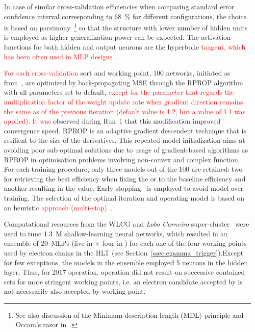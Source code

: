 In case of similar cross-validation efficiencies when comparing standard
error confidence interval corresponding to \SI{68}{\%} for different
configurations, the choice is based on
parsimony~\cite{medeiros2001statistical}\footnote{See also discussion of the
  Minimum-description-length (MDL) principle and Occam's razor
in~\cite{haykin_2008}.} so that the structure with lower number of hidden units
is employed as higher generalization power can be expected. The activation
functions for both hidden and output neurons are the hyperbolic \textcolor{red}{tangent, which has been often used in MLP designs~\cite{haykin_2008}}.






\textcolor{red}{For each cross-validation} sort and working point, 100 networks, initiated
as from~\cite{initnw}, are optimized by back-propagating MSE through the RPROP
algorithm~\cite{rprop} with all parameters set to default,
\textcolor{red}{except for the parameter that regards the multiplication factor of the weight update rate when gradient direction remains the same as of the previous iteration (default value is 1.2, but a value of 1.1 was applied). It was }
observed during Run~1 that this modification improved convergence speed. RPROP
is an adaptive gradient descendent technique that is resilient to the size of
the derivatives. This repeated model initialization aims at
avoiding poor sub-optimal solutions due to usage of gradient-based algorithms as
RPROP in optimisation problems involving non-convex and complex function.
For each training procedure, only three models out of the 100 are retained: two
for retrieving the best efficiency when fixing the \pd{} or \pf{} to the
baseline \fastcalo{} efficiency and another resulting in the \spmax{} value.
Early stopping~\cite{haykin_2008} is employed to avoid model over-training. The
selection of the optimal iteration and operating model is based on an heuristic \textcolor{red}{approach (multi-stop)~\cite{Goodfellow2016}}.


Computational resources from the WLCG and \emph{Lobo Carneiro}
super-cluster~\cite{lobo_carneiro} were used to tune 1.3~M shallow-learning
neural networks, which resulted in an ensemble of \SI{20}{MLPs} (five in \et{}
$\times$ four in \abseta{})  for each one of the four working points used by
electron chains in the HLT (see Section~\ref{ssec:egamma_trigger}).\@ Except 
for few exceptions, the models in the ensemble employed 5 neurons in the 
hidden layer.  Thus, for 2017 operation, 
\rnn{} operation did not result on
successive contained sets for more stringent working points, i.e. an electron
candidate accepted by \medium{} is not necessarily also accepted by \loose{}
working point. %


